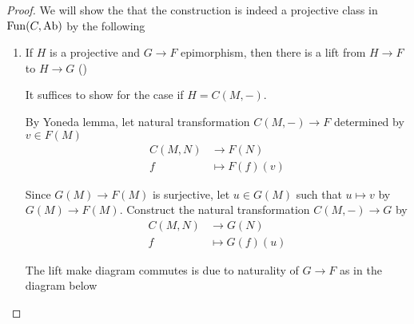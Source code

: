 \documentclass{report}
\begin{document}
\begin{proof} We will show the that the construction is indeed a projective class in $\operatorname{Fun}(C, \operatorname{Ab})$ by the following
    \begin{enumerate}
        \item If $H$ is a projective and $G \to F$ epimorphism, then there is a lift from $H \to F$ to $H \to G$ ()

        It suffices to show for the case if $H = C(M, -)$.
        \begin{center}
        \end{center}
        By Yoneda lemma, let natural transformation $C(M, -) \to F$ determined by $v \in F(M)$
        \begin{align*}
            C(M, N) &\to F(N) \\
            f &\mapsto F(f)(v)
        \end{align*}

        Since $G(M) \to F(M)$ is surjective, let $u \in G(M)$ such that $u \mapsto v$ by $G(M) \to F(M)$. Construct the natural transformation $C(M, -) \to G$ by
        \begin{align*}
            C(M, N) &\to G(N) \\
            f &\mapsto G(f)(u)
        \end{align*}

        The lift make diagram commutes is due to naturality of $G \to F$ as in the diagram below


\end{enumerate}
\end{proof}
\end{document}
